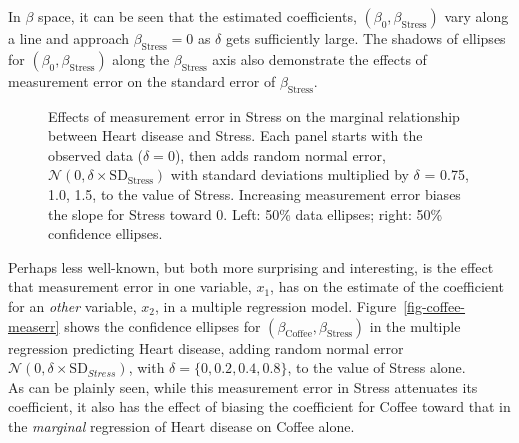 \documentclass[
  letterpaper,
  10pt,
  krantz2]{krantz}
\begin{document}
In \(\beta\) space, it can be seen that the estimated coefficients,
\((\beta_0, \beta_{\textrm{Stress}})\) vary along a line and approach
\(\beta_{\textrm{Stress}}=0\) as \(\delta\) gets sufficiently large. The
shadows of ellipses for \((\beta_0, \beta_{\textrm{Stress}})\) along the
\(\beta_{\textrm{Stress}}\) axis also demonstrate the effects of
measurement error on the standard error of \(\beta_{\textrm{Stress}}\).

\begin{figure}


\caption{\label{fig-coffee-measerr-data-beta}Effects of measurement
error in Stress on the marginal relationship between Heart disease and
Stress. Each panel starts with the observed data (\(\delta = 0\)), then
adds random normal error,
\(\mathcal{N}(0, \delta \times \text{SD}_\text{Stress})\) with standard
deviations multiplied by \(\delta\) = 0.75, 1.0, 1.5, to the value of
Stress. Increasing measurement error biases the slope for Stress toward
0. Left: 50\% data ellipses; right: 50\% confidence ellipses.}

\end{figure}%

Perhaps less well-known, but both more surprising and interesting, is
the effect that measurement error in one variable, \(x_1\), has on the
estimate of the coefficient for an \emph{other} variable, \(x_2\), in a
multiple regression model. Figure~\ref{fig-coffee-measerr} shows the
confidence ellipses for
\((\beta_{\textrm{Coffee}}, \beta_{\textrm{Stress}})\) in the multiple
regression predicting Heart disease, adding random normal error
\(\mathcal{N}(0, \delta \times \mathrm{SD}_{Stress})\), with
\(\delta = \{0, 0.2, 0.4, 0.8\}\), to the value of Stress alone.\\
As can be plainly seen, while this measurement error in Stress
attenuates its coefficient, it also has the effect of biasing the
coefficient for Coffee toward that in the \emph{marginal} regression of
Heart disease on Coffee alone.
\end{document}
